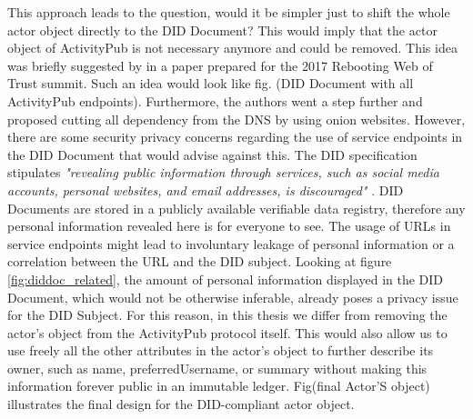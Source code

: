 This approach leads to the question, would it be simpler just to shift the whole actor object directly to the DID Document? This would imply that the actor object of ActivityPub is not necessary anymore and could be removed. This idea was briefly suggested by \cite{webber_sporny_2017} in a paper prepared for the 2017 Rebooting Web of Trust summit. Such an idea would look like fig. (DID Document with all ActivityPub endpoints). Furthermore, the authors went a step further and proposed cutting all dependency from the DNS by using onion websites. However, there are some security privacy concerns regarding the use of service endpoints in the DID Document that would advise against this. The DID specification stipulates \emph{"revealing public information through services, such as social media accounts, personal websites, and email addresses, is discouraged"} \cite{sporny_longley_sabadello_reed_steele_2021}. DID Documents are stored in a publicly available verifiable data registry, therefore any personal information revealed here is for everyone to see. The usage of URLs in service endpoints might lead to involuntary leakage of personal information or a correlation between the URL and the DID subject. Looking at figure \ref{fig:diddoc_related}, the amount of personal information displayed in the DID Document, which would not be otherwise inferable, already poses a privacy issue for the DID Subject. For this reason, in this thesis we differ from removing the actor's object from the ActivityPub protocol itself. This would also allow us to use freely all the other attributes in the actor's object to further describe its owner, such as name, preferredUsername, or summary without making this information forever public in an immutable ledger. Fig(final Actor'S object) illustrates the final design for the DID-compliant actor object. 

